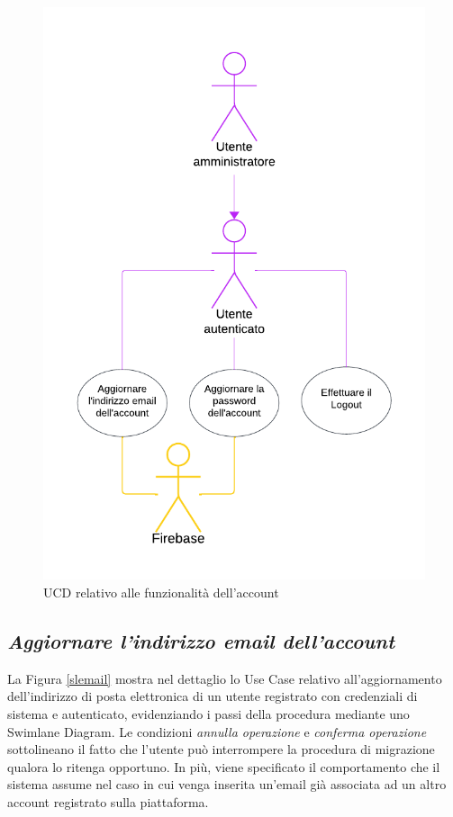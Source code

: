 \documentclass[11pt, a4paper]{article}
\theoremstyle{definition} %
\begin{document}
\begin{figure}[H]
\centering
\includegraphics[scale = 0.95]{materiale/ucdiagrams/ucaccount.pdf}
\caption{UCD relativo alle funzionalità dell'account}
\label{accountfig}
\end{figure}



\newpage
\subsection*{\textit{Aggiornare l'indirizzo email dell'account}}
La Figura \ref{slemail} mostra nel dettaglio lo Use Case relativo all'aggiornamento
dell'indirizzo di posta elettronica di un utente registrato con credenziali di sistema
e autenticato, evidenziando i passi della procedura mediante uno Swimlane Diagram.
Le condizioni \textit{annulla operazione} e \textit{conferma operazione}
sottolineano il fatto che l'utente può interrompere la procedura di migrazione
qualora lo ritenga opportuno. In più, viene specificato il comportamento che
il sistema assume nel caso in cui venga inserita un'email già associata ad un
altro account registrato sulla piattaforma.
\end{document}
